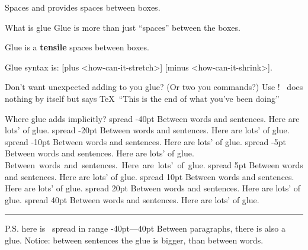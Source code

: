 \graphicspath{{sec03/images/}{sec03/code/s3/}}
\lstset{inputpath=sec03/code/s3/}

\begin{frame}{Spaces}\relax
{\LARGE {} and  provides spaces between boxes.}

\end{frame}

\cprotect{}

\begin{frame}{What is glue}\relax
Glue is more than just ``spaces'' between the boxes.

Glue is a {\bfseries \csk tensile} spaces between boxes.

\incPause
Glue syntax is: {} [{\csk plus <how-can-it-stretch>}] [{\csk minus <how-can-it-shrink>}].
     
\end{frame}

\begin{frame}{\ccol\relax}\relax
     Don't want unexpected adding to you glue? (Or two you commands?) Use \ccol\relax! \ccol\relax\ does nothing by itself but says \TeX\ ``This is the end of what you've been doing''
     
\end{frame}


\begin{frame}{Where glue adds implicitly?}\relax
\obeylines
\hbox spread -40pt {Between words and sentences. Here are lots' of glue.}
\hbox spread -20pt {Between words and sentences. Here are lots' of glue.}
\hbox spread -10pt {Between words and sentences. Here are lots' of glue.}
\hbox spread -5pt {Between words and sentences. Here are lots' of glue.}
\hbox{Between words and sentences. Here are lots' of glue.}
\hbox spread 5pt {Between words and sentences. Here are lots' of glue.}
\hbox spread 10pt {Between words and sentences. Here are lots' of glue.}
\hbox spread 20pt {Between words and sentences. Here are lots' of glue.}
\hbox spread 40pt {Between words and sentences. Here are lots' of glue.}
\hrule
\small P.S. here is \string\hbox\ spread in range -40pt---40pt
\small Between paragraphs, there is also a glue. Notice: between sentences the glue is bigger, than between words.
\end{frame}

